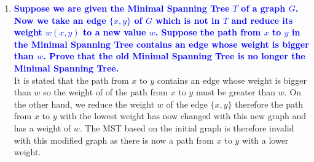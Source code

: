 \documentclass[11pt]{article}
\begin{document}
\begin{enumerate}
\item \textbf{\textcolor{blue}{Suppose we are given the Minimal Spanning Tree $T$ of a graph
$G$.  Now we take an edge $\{x,y\}$ of $G$ which is not in $T$ and
reduce its weight $w(x,y)$ to a new value $w$.  Suppose the path from
$x$ to $y$ in the Minimal Spanning Tree contains an edge whose weight
is bigger than $w$.  Prove that the old Minimal Spanning Tree is no
longer the Minimal Spanning Tree.}}
    \\ It is stated that the path from $x$ to $y$ contains an edge whose weight is bigger than $w$ so the weight of of the path 
    from $x$ to $y$ must be greater than $w$. On the other hand, we reduce the weight $w$ of the edge $\{x,y\}$ therefore the path from $x$ to $y$ with the lowest weight has now changed with this new graph and has a weight of $w$. The MST based on the initial graph is therefore invalid with this modified graph as there is now a path from $x$ to $y$ with a lower weight.
    

\end{enumerate}
\end{document}
